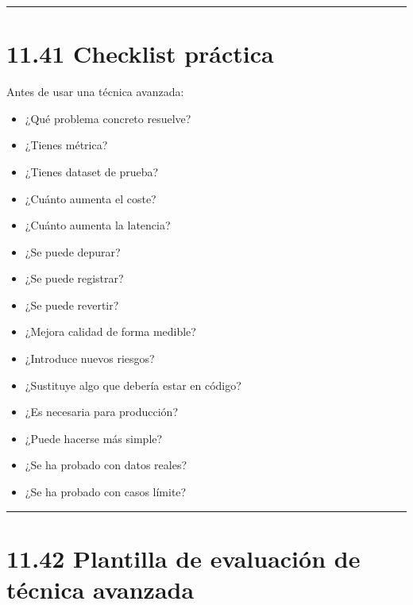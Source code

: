 \begin{center}\rule{0.5\linewidth}{0.5pt}\end{center}

\section{11.41 Checklist práctica}\label{checklist-pruxe1ctica-10}

Antes de usar una técnica avanzada:

\begin{itemize}
\tightlist
\item
  ¿Qué problema concreto resuelve?
\item
  ¿Tienes métrica?
\item
  ¿Tienes dataset de prueba?
\item
  ¿Cuánto aumenta el coste?
\item
  ¿Cuánto aumenta la latencia?
\item
  ¿Se puede depurar?
\item
  ¿Se puede registrar?
\item
  ¿Se puede revertir?
\item
  ¿Mejora calidad de forma medible?
\item
  ¿Introduce nuevos riesgos?
\item
  ¿Sustituye algo que debería estar en código?
\item
  ¿Es necesaria para producción?
\item
  ¿Puede hacerse más simple?
\item
  ¿Se ha probado con datos reales?
\item
  ¿Se ha probado con casos límite?
\end{itemize}

\begin{center}\rule{0.5\linewidth}{0.5pt}\end{center}

\section{11.42 Plantilla de evaluación de técnica
avanzada}\label{plantilla-de-evaluaciuxf3n-de-tuxe9cnica-avanzada}

